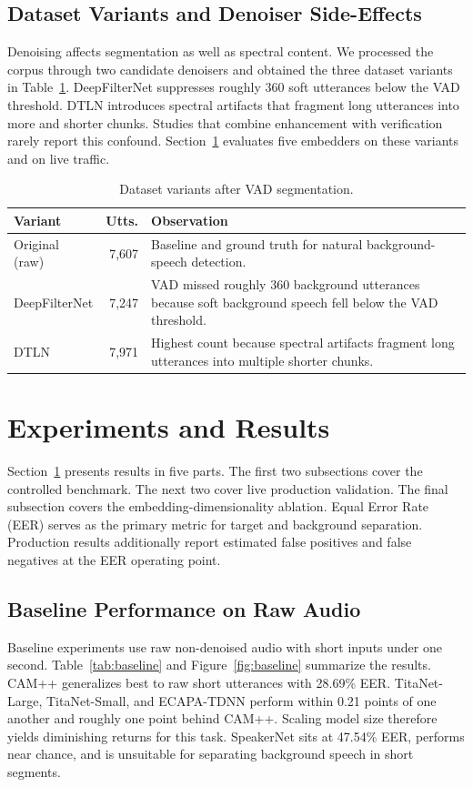 \documentclass{llncs}
\begin{document}
\subsection{Dataset Variants and Denoiser Side-Effects}
Denoising affects segmentation as well as spectral content. We processed the corpus through two candidate denoisers and obtained the three dataset variants in Table~\ref{tab:variants}. DeepFilterNet suppresses roughly 360 soft utterances below the VAD threshold. DTLN introduces spectral artifacts that fragment long utterances into more and shorter chunks. Studies that combine enhancement with verification rarely report this confound. Section~\ref{sec:experiments} evaluates five embedders on these variants and on live traffic.

\begin{table}[t]
\centering
\caption{Dataset variants after VAD segmentation.}
\label{tab:variants}
\footnotesize
\begin{tabular}{@{}lr>{\raggedright\arraybackslash}p{6.2cm}@{}}
\toprule
\textbf{Variant} & \textbf{Utts.} & \textbf{Observation} \\
\midrule
Original (raw) & 7{,}607 & Baseline and ground truth for natural background-speech detection. \\
DeepFilterNet & 7{,}247 & VAD missed roughly 360 background utterances because soft background speech fell below the VAD threshold. \\
DTLN & 7{,}971 & Highest count because spectral artifacts fragment long utterances into multiple shorter chunks. \\
\bottomrule
\end{tabular}
\end{table}

\section{Experiments and Results}\label{sec:experiments}
Section~\ref{sec:experiments} presents results in five parts. The first two subsections cover the controlled benchmark. The next two cover live production validation. The final subsection covers the embedding-dimensionality ablation. Equal Error Rate (EER) serves as the primary metric for target and background separation. Production results additionally report estimated false positives and false negatives at the EER operating point.

\subsection{Baseline Performance on Raw Audio}
Baseline experiments use raw non-denoised audio with short inputs under one second. Table~\ref{tab:baseline} and Figure~\ref{fig:baseline} summarize the results. CAM++ generalizes best to raw short utterances with 28.69\% EER. TitaNet-Large, TitaNet-Small, and ECAPA-TDNN perform within 0.21 points of one another and roughly one point behind CAM++. Scaling model size therefore yields diminishing returns for this task. SpeakerNet sits at 47.54\% EER, performs near chance, and is unsuitable for separating background speech in short segments.
\end{document}
